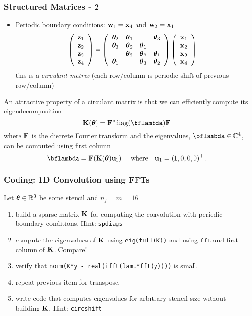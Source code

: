 \documentclass[12pt,fleqn,handout]{beamer}
\begin{document}
\begin{frame}
	\frametitle{Structured Matrices - 2}
	\begin{itemize}
		\item Periodic boundary conditions: ${\bf w}_1 = {\bf x}_4$ and ${\bf w}_2 = {\bf x}_1$
	$$
		\left( 
		\begin{array}{r}
			{\bf z}_1\\
			{\bf z}_2\\
			{\bf z}_3\\
			{\bf z}_4
		\end{array}
		\right)
		=
		\left( 
		\begin{array}{rrrr}
			        {\boldsymbol \theta}_2 & {\boldsymbol \theta}_1 &          & {\boldsymbol \theta}_3  \\
			        {\boldsymbol \theta}_3 & {\boldsymbol \theta}_2 & {\boldsymbol \theta}_1 &           \\
			                 & {\boldsymbol \theta}_3 & {\boldsymbol \theta}_2 & {\boldsymbol \theta}_1  \\
			        {\boldsymbol \theta}_1 &          & {\boldsymbol \theta}_3 & {\boldsymbol \theta}_2  \\
		\end{array}
		\right)
		\left( 
		\begin{array}{r}
			{\bf x}_1\\
			{\bf x}_2\\
			{\bf x}_3\\
			{\bf x}_4\\
		\end{array}
		\right)
	$$
	this is a \emph{circulant matrix} (each row/column is periodic shift of previous row/column)
	\end{itemize}
	\pause
	
	An attractive property of a circulant matrix is that we can efficiently compute its eigendecomposition
	$$
		\bfK(\bftheta) = \bfF^* {\rm diag}(\bflambda) \bfF
	$$ 
	where ${\bf F}$ is the discrete Fourier transform and the eigenvalues, $\bflambda \in {\mathbb{C}}^4$, can be computed using first column
	$$
		\bflambda =   \bfF( \bfK(\bftheta) \bfu_1) \quad \text{ where} \quad \bfu_1 = (1,0,0,0)^\top.
	$$ 	
\end{frame}

\begin{frame}\frametitle{Coding: 1D Convolution using FFTs}
	Let ${\boldsymbol \theta} \in \mathbb{R}^3$ be some stencil and $n_f = m = 16$ 
\begin{enumerate}
	\item build a sparse matrix ${\bf K}$ for computing the convolution with periodic boundary conditions. 
	Hint: \texttt{spdiags}
	
	\item compute the eigenvalues of ${\bf K}$ using \texttt{eig(full(K))} and using $\texttt{fft}$ and first column of ${\bf K}$. Compare!
	
	\item verify that \texttt{norm(K*y - real(ifft(lam.*fft(y))))} is small.
	
	\item repeat previous item for transpose.
	
	\item write code that computes eigenvalues for arbitrary stencil size without building ${\bf K}$. Hint: \texttt{circshift}
\end{enumerate}
\end{frame}
\end{document}
